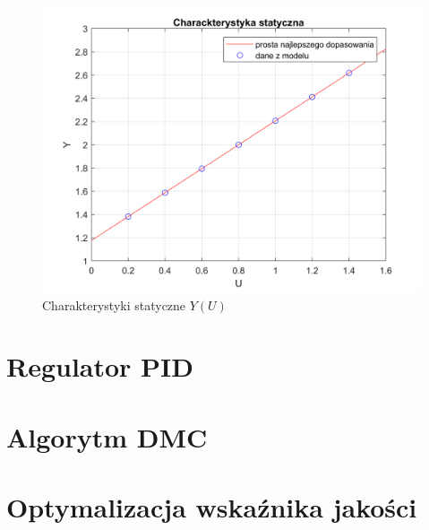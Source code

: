 \begin{figure}
\label{char_stat}
\centering
\caption{Charakterystyki statyczne $Y(U)$}
\includegraphics{static_characteristics.png}
\end{figure}

\section{Regulator PID}

\section{Algorytm DMC}

\section{Optymalizacja wskaźnika jakości}